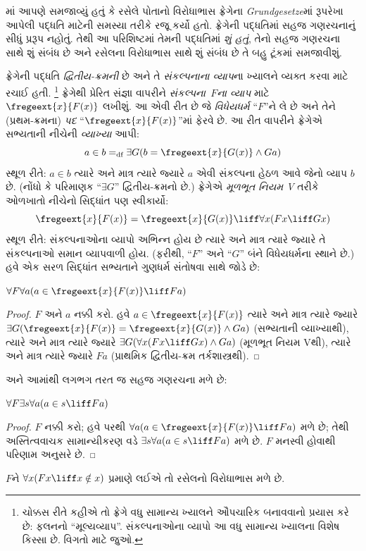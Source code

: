 \documentclass[../../../include/open-logic-section]{subfiles}
\begin{document}


માં આપણે સમજાવ્યું હતું કે રસેલે પોતાનો
વિરોધાભાસ ફ્રેગેના \emph{Grundgesetze}માં રૂપરેખા આપેલી પદ્ધતિ
માટેની સમસ્યા તરીકે રજૂ કર્યો હતો. ફ્રેગેની પદ્ધતિમાં સહજ ગણરચનાનું
સીધું પ્રરૂપ નહોતું. તેથી આ પરિશિષ્ટમાં તેમની પદ્ધતિમાં
\emph{શું હતું}, તેનો સહજ ગણરચના સાથે શું સંબંધ છે અને રસેલના
વિરોધાભાસ સાથે શું સંબંધ છે તે બહુ ટૂંકમાં સમજાવીશું.

ફ્રેગેની પદ્ધતિ \emph{દ્વિતીય-ક્રમની} છે અને તે
\emph{સંકલ્પનાના વ્યાપ}ના ખ્યાલને વ્યક્ત કરવા માટે રચાઈ હતી.
\footnote{ચોક્કસ રીતે કહીએ તો ફ્રેગે વધુ સામાન્ય ખ્યાલને
ઔપચારિક બનાવવાનો પ્રયાસ કરે છે: ફલનનો ``મૂલ્યવ્યાપ''.
સંકલ્પનાઓના વ્યાપો આ વધુ સામાન્ય ખ્યાલના વિશેષ કિસ્સા છે.
વિગતો માટે \citet[pp.\ 8--9]{Heck2012} જુઓ.}
ફ્રેગેથી પ્રેરિત સંજ્ઞા વાપરીને
\emph{સંકલ્પના~$F$ના વ્યાપ} માટે $\fregeext{x}{F(x)}$ લખીશું.
આ એવી રીત છે જે \emph{વિધેયધર્મ} ``$F$''ને લે છે અને તેને
(પ્રથમ-ક્રમના) \emph{પદ} ``$\fregeext{x}{F(x)}$''માં ફેરવે છે.
આ રીત વાપરીને ફ્રેગેએ સભ્યતાની નીચેની \emph{વ્યાખ્યા} આપી:
\[
a \in b =_\text{df} \exists G(b = \fregeext{x}{G(x)} \land Ga)
\]
સ્થૂળ રીતે: $a \in b$ ત્યારે અને માત્ર ત્યારે જ્યારે $a$ એવી
સંકલ્પના હેઠળ આવે જેનો વ્યાપ $b$ છે. (નોંધો કે પરિમાણક
``$\exists G$'' દ્વિતીય-ક્રમનો છે.) ફ્રેગેએ
\emph{મૂળભૂત નિયમ V} તરીકે ઓળખાતો નીચેનો સિદ્ધાંત પણ સ્વીકાર્યો:
$$\fregeext{x}{F(x)} = \fregeext{x}{G(x)} \liff \forall x (Fx \liff Gx)$$
સ્થૂળ રીતે: સંકલ્પનાઓના વ્યાપો અભિન્ન હોય છે ત્યારે અને માત્ર
ત્યારે જ્યારે તે સંકલ્પનાઓ સમાન વ્યાપવાળી હોય. (ફરીથી, ``$F$''
અને ``$G$'' બંને વિધેયધર્મના સ્થાને છે.) હવે એક સરળ સિદ્ધાંત
સભ્યતાને ગુણધર્મ સંતોષવા સાથે જોડે છે:

\begin{lem}
$\forall F \forall a(a \in \fregeext{x}{F(x)} \liff Fa)$
\end{lem}

\begin{proof}
$F$ અને $a$ નક્કી કરો. હવે $a \in \fregeext{x}{F(x)}$ ત્યારે અને
માત્ર ત્યારે જ્યારે $\exists G(\fregeext{x}{F(x)}
= \fregeext{x}{G(x)} \land Ga)$ (સભ્યતાની વ્યાખ્યાથી), ત્યારે અને
માત્ર ત્યારે જ્યારે $\exists G(\forall x(Fx \liff Gx) \land Ga)$
(મૂળભૂત નિયમ Vથી), ત્યારે અને માત્ર ત્યારે જ્યારે $Fa$
(પ્રાથમિક દ્વિતીય-ક્રમ તર્કશાસ્ત્રથી).
\end{proof}

અને આમાંથી લગભગ તરત જ સહજ ગણરચના મળે છે:

\begin{lem}
$\forall F \exists s \forall a (a \in s \liff Fa)$
\end{lem}

\begin{proof}
$F$ નક્કી કરો; હવે  પરથી
$\forall a (a \in
\fregeext{x}{F(x)} \liff Fa)$ મળે છે; તેથી અસ્તિત્વવાચક
સામાન્યીકરણ વડે $\exists s\forall a(a \in s \liff Fa)$ મળે છે.
$F$ મનસ્વી હોવાથી પરિણામ અનુસરે છે.
\end{proof}

$F$ને $\forall x(Fx \liff x \notin x)$ પ્રમાણે લઈએ તો રસેલનો
વિરોધાભાસ મળે છે.
\end{document}
